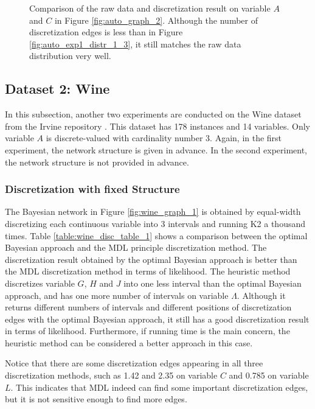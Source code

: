 \begin{figure}[ht]
\centering
      
  \caption{Comparison of the raw data and discretization result on variable $A$ and $C$ in Figure \ref{fig:auto_graph_2}. Although the number of discretization edges is less than in Figure \ref{fig:auto_exp1_distr_1_3}, it still matches the raw data distribution very well.}
  \label{fig:auto_exp2_distr_1_3}
\end{figure}


\subsection{Dataset 2: Wine}
\label{subsec:wine}

In this subsection, another two experiments are conducted on the Wine dataset from the Irvine repository \citep{Lichman_2013}. This dataset has 178 instances and 14 variables. Only variable $A$ is discrete-valued with cardinality number \num{3}. Again, in the first experiment, the network structure is given in advance. In the second experiment, the network structure is not provided in advance.

\subsubsection{Discretization with fixed Structure}
\label{subsubsec:wine_exp1}

The Bayesian network in Figure \ref{fig:wine_graph_1} is obtained by equal-width discretizing each continuous variable into 3 intervals and running K2 a thousand times. Table \ref{table:wine_disc_table_1} shows a comparison between the optimal Bayesian approach and the MDL principle discretization method.
The discretization result obtained by the optimal Bayesian approach is better than the MDL discretization method in terms of likelihood. The heuristic method discretizes variable $G$, $H$ and $J$ into one less interval than the optimal Bayesian approach, and has one more number of intervals on variable $\Lambda$.
Although it returns different numbers of intervals and different positions of discretization edges with the optimal Bayesian approach, it still has a good discretization result in terms of likelihood. Furthermore, if running time is the main concern, the heuristic method can be considered a better approach in this case.

Notice that there are some discretization edges appearing in all three discretization methods, such as \num{1.42} and \num{2.35} on variable $C$ and \num{0.785} on variable $L$. This indicates that MDL indeed can find some important discretization edges, but it is not sensitive enough to find more edges.

